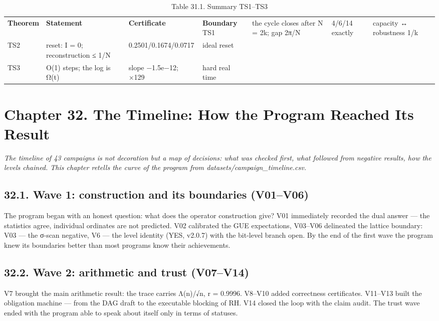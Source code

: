 \documentclass[11pt,a4paper]{article}
\begin{document}
\begin{table}[htbp]\centering\small
\caption{Table 31.1. Summary TS1–TS3}
\begin{tabular}{p{} p{} p{} p{}}
\toprule
\textbf{Theorem} & \textbf{Statement} & \textbf{Certificate} & \textbf{Boundary}
\midrule
TS1 & the cycle closes after N = 2k; gap 2π/N & 4/6/14 exactly & capacity ↔ robustness 1/k \\
TS2 & reset: I = 0; reconstruction ≤ 1/N & 0.2501/0.1674/0.0717 & ideal reset \\
TS3 & O(1) steps; the log is Ω(t) & slope −1.5e−12; ×129 & hard real time \\
\bottomrule
\end{tabular}
\end{table}

\section{Chapter 32. The Timeline: How the Program Reached Its Result}

\noindent\textit{\color{copper}The timeline of 43 campaigns is not decoration but a map of decisions: what was checked first, what followed from negative results, how the levels chained. This chapter retells the curve of the program from datasets/campaign\_timeline.csv.}

\subsection{32.1. Wave 1: construction and its boundaries (V01–V06)}

The program began with an honest question: what does the operator construction give? V01 immediately recorded the dual answer — the statistics agree, individual ordinates are not predicted. V02 calibrated the GUE expectations, V03–V06 delineated the lattice boundary: V03 — the σ-scan negative, V6 — the level identity (YES, v2.0.7) with the bit-level branch open. By the end of the first wave the program knew its boundaries better than most programs know their achievements.

\subsection{32.2. Wave 2: arithmetic and trust (V07–V14)}

V7 brought the main arithmetic result: the trace carries Λ(n)/√n, r = 0.9996. V8–V10 added correctness certificates. V11–V13 built the obligation machine — from the DAG draft to the executable blocking of RH. V14 closed the loop with the claim audit. The trust wave ended with the program able to speak about itself only in terms of statuses.
\end{document}
